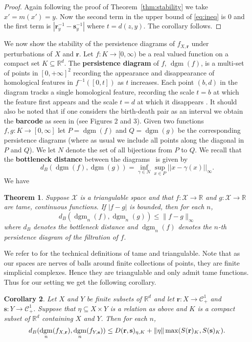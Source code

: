 \documentclass{amsart}
\newtheorem{theorem}{Theorem}[section]
\newtheorem*{fibering lemma}{Fibering Lemma}
\newtheorem*{decomposition lemma}{Decomposition Lemma}
\newtheorem*{hurewicz theorem}{Hurewicz Theorem}
\newtheorem{corollary}[theorem]{Corollary}
\theoremstyle{definition}
\newcommand{\df}[1]{{{\bf #1}}}
\DeclareMathOperator{\dgm}{dgm}
\begin{document}
\begin{proof}
Again following the proof of Theorem~\ref{thm:stability} we take $x'=m(x')=y$.  Now the second term in the upper bound of \eqref{eq:ineq} is $0$ and the first term is $|\mathbf{r}^{-1}_{y}-\mathbf{s}^{-1}_{y}|$ where $t=d(z,y)$. The corollary follows.
\end{proof}

We now show the stability of the persistence diagrams of $f_{X,\mathbf{r}}$ under perturbations of $X$ and $\mathbf{r}$.  Let $f: K \to [0,\infty)$ be a real valued function on a compact set $K \subseteq \mathbb{R}^d$. The \df{persistence diagram} of $f$, $\dgm(f)$, is a multi-set of points in $[0, +\infty]^2$ recording the appearance and disappearance of homological features in $f^{-1}([0,t])$ as $t$ increases.  Each point $(b,d)$ in the diagram tracks a single homological feature, recording the scale $t=b$ at which the feature first appears and the scale $t=d$ at which it disappears \cite{Ede:10}. It should also be noted that if one considers the birth-death pair as an interval we obtain the \df{barcode} as seen in \cite{Zom:05} (see Figures 2 and 3).  Given two functions $f,g : K \to [0, \infty]$ let $P = \dgm(f)$ and $Q = \dgm(g)$ be the corresponding persistence diagrams (where as usual we include all points along the diagonal in $P$ and $Q$). We let $N$ denote the set of all bijections from $P$ to $Q$. We recall that the \df{bottleneck distance} between the diagrams~\cite{Ede:10} is given by
\[
d_B(\dgm(f),\dgm(g)) = \inf_{\gamma \in N} \sup_{x \in P} ||x - \gamma(x)||_\infty\text{.}
\]
We have 
\begin{theorem}\cite[Theorem 6.9]{CSEH} Suppose $\mathcal{X}$ is a triangulable space and that $f:\mathcal{X}\to \mathbb{R}$ and $g:\mathcal{X}\to \mathbb{R}$ are tame, continuous functions. If $|f-g|$ is bounded, then for each $n$,
\[d_B(\dgm_n(f), \dgm_n(g))\le \|f-g\|_\infty\]
where $d_B$ denotes the bottleneck distance and $\dgm_n(f)$ denotes the $n$-th persistence diagram of the filtration of $f$.
\end{theorem}
We refer to \cite{Ede:10} for the technical definitions of tame and triangulable.  Note that as our spaces are nerves of balls around finite collections of points, they are finite simplicial complexes.  Hence they are triangulable and only admit tame functions.  Thus for our setting we get the following corollary.
\begin{corollary}
Let $X$ and $Y$ be finite subsets of $\mathbb{R}^d$ and let  $\mathbf{r}:X \to {\mathcal C}^1_+$ and $\mathbf{s} : Y \to {\mathcal C}^1_+$.  Suppose that $\eta\subseteq X\times Y$ is a relation as above and $K$ is a compact subset of $\mathbb{R}^d$ containing $X$ and $Y$.  Then for each $n$,
\[d_B(\dgm_n(f_{X,\mathbf{r}}),\dgm_n(f_{Y,\mathbf{s}})) \le D(\mathbf{r},\mathbf{s})_{\eta,K}+ \|\eta\| \max( S(\mathbf{r})_K, S(\mathbf{s})_K)\hbox{.}\] 
\end{corollary}
\end{document}
